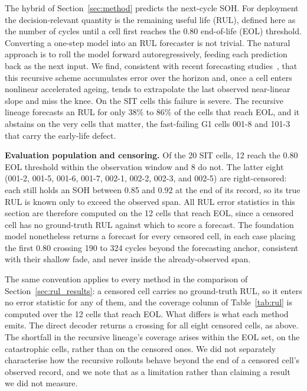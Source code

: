 The hybrid of Section~\ref{sec:method} predicts the next-cycle SOH. For deployment the
decision-relevant quantity is the remaining useful life (RUL), defined here as the number of
cycles until a cell first reaches the 0.80 end-of-life (EOL) threshold. Converting a one-step
model into an RUL forecaster is not trivial. The natural approach is to roll the model forward
autoregressively, feeding each prediction back as the next input. We find, consistent with
recent forecasting studies~\cite{seq2seq_rul, ed_lstm}, that this recursive scheme accumulates
error over the horizon and, once a cell enters nonlinear accelerated ageing, tends to
extrapolate the last observed near-linear slope and miss the knee. On the SIT cells this
failure is severe. The recursive lineage forecasts an RUL for only 38\% to 86\% of the cells
that reach EOL, and it abstains on the very cells that matter, the fast-failing G1
cells 001-8 and 101-3 that carry the early-life defect.

\textbf{Evaluation population and censoring.} Of the 20 SIT cells, 12 reach the 0.80 EOL
threshold within the observation window and 8 do not. The latter eight (001-2, 001-5, 001-6,
001-7, 002-1, 002-2, 002-3, and 002-5) are right-censored: each still holds an SOH between 0.85
and 0.92 at the end of its record, so its true RUL is known only to exceed the observed span.
All RUL error statistics in this section are therefore computed on the 12 cells that reach EOL,
since a censored cell has no ground-truth RUL against which to score a forecast. The foundation
model nonetheless returns a forecast for every censored cell, in each case placing the first
0.80 crossing 190 to 324 cycles beyond the forecasting anchor, consistent with their shallow
fade, and never inside the already-observed span.

The same convention applies to every method in the comparison of
Section~\ref{sec:rul_results}: a censored cell carries no ground-truth RUL, so it enters no
error statistic for any of them, and the coverage column of Table~\ref{tab:rul} is computed
over the 12 cells that reach EOL. What differs is what each method emits. The direct
decoder returns a crossing for all eight censored cells, as above. The shortfall in the
recursive lineage's coverage arises within the EOL set, on the catastrophic cells, rather
than on the censored ones. We did not separately characterise how the recursive rollouts
behave beyond the end of a censored cell's observed record, and we note that as a
limitation rather than claiming a result we did not measure.


